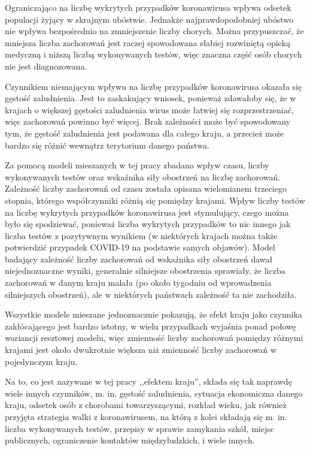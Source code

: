 \documentclass[12pt]{mwbk}
\theoremstyle{plain}
\theoremstyle{definition}
\theoremstyle{definition}
\begin{document}
Ograniczająco na liczbę wykrytych przypadków koronawirusa wpływa odsetek populacji żyjący w skrajnym ubóstwie. Jednakże najprawdopodobniej ubóstwo nie wpływa bezpośrednio na zmniejszenie liczby chorych. Można przypuszczać, że mniejsza liczba zachorowań jest raczej spowodowana słabiej rozwiniętą opieką medyczną i niższą liczbą wykonywanych testów, więc znaczna część osób chorych nie jest diagnozowana.

Czynnikiem niemającym wpływu na liczbę przypadków koronawirusa okazała się gęstość zaludnienia. Jest to zaskakujący wniosek, ponieważ zdawałoby się, że w krajach o większej gęstości zaludnienia wirus może łatwiej się rozprzestrzeniać, więc zachorowań powinno być więcej. Brak zależności może być spowodowany tym, że gęstość zaludnienia jest podawana dla całego kraju, a przecież może bardzo się różnić wewnątrz terytorium danego państwa.

Za pomocą modeli mieszanych w tej pracy zbadano wpływ czasu, liczby wykonywanych testów oraz wskaźnika siły obostrzeń na liczbę zachorowań. Zależność liczby zachorowań od czasu została opisana wielomianem trzeciego stopnia, którego współczynniki różnią się pomiędzy krajami. Wpływ liczby testów na liczbę wykrytych przypadków koronawirusa jest stymulujący, czego można było się spodziewać, ponieważ liczba wykrytych przypadków to nic innego jak liczba testów z pozytywnym wynikiem (w niektórych krajach można także potwierdzić przypadek COVID-19 na podstawie samych objawów). Model badający zależność liczby zachorowań od wskaźnika siły obostrzeń dawał niejednoznaczne wyniki, generalnie silniejsze obostrzenia sprawiały, że liczba zachorowań w danym kraju malała (po około tygodniu od wprowadzenia silniejszych obostrzeń), ale w niektórych państwach zależność ta nie zachodziła.

Wszystkie modele mieszane jednoznacznie pokazują, że efekt kraju jako czynnika zakłócającego jest bardzo istotny, w wielu przypadkach wyjaśnia ponad połowę wariancji resztowej modelu, więc zmienność liczby zachorowań pomiędzy różnymi krajami jest około dwukrotnie większa niż zmienność liczby zachorowań w pojedynczym kraju.

Na to, co jest nazywane w tej pracy ,,efektem kraju'', składa się tak naprawdę wiele innych czynników, m. in. gęstość zaludnienia, sytuacja ekonomiczna danego kraju, odsetek osób z chorobami towarzyszącymi, rozkład wieku, jak również przyjęta strategia walki z koronawirusem, na którą z kolei składają się m. in. liczba wykonywanych testów, przepisy w sprawie zamykania szkół, miejsc publicznych, ograniczenie kontaktów międzyludzkich, i wiele innych.
\end{document}
